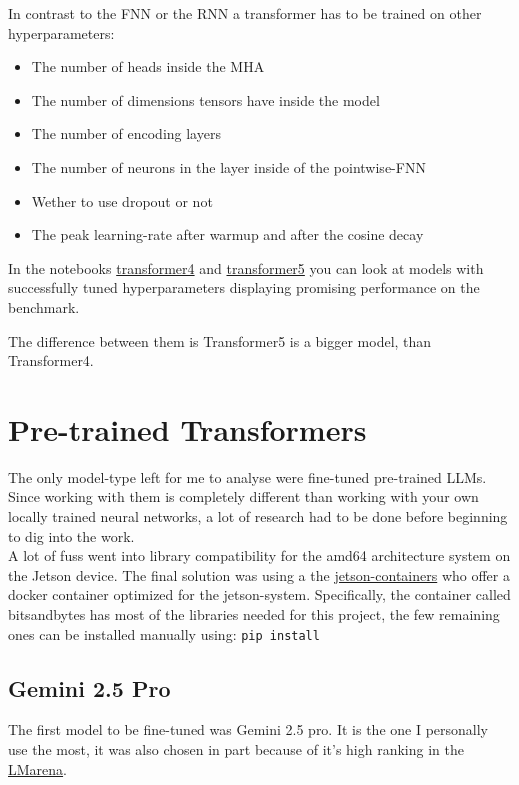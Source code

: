 \documentclass{article}
\begin{document}
In contrast to the FNN or the RNN a transformer has to be trained on other 
hyperparameters: 
\begin{itemize}
    \item The number of heads inside the MHA
    \item The number of dimensions tensors have inside the model
    \item The number of encoding layers
    \item The number of neurons in the layer inside of the pointwise-FNN
    \item Wether to use dropout or not
    \item The peak learning-rate after warmup and after the cosine decay
\end{itemize}


In the notebooks \href{https://github.com/AntonStantan/matura/blob/main/transformer/transformer4.ipynb}
{transformer4} and \href{https://github.com/AntonStantan/matura/blob/main/transformer/transformer5.ipynb}
{transformer5} you can look at models with successfully tuned 
hyperparameters displaying promising performance on the benchmark.

The difference between them is Transformer5 is a bigger model, than 
Transformer4.

\section{Pre-trained Transformers}

The only model-type left for me to analyse were fine-tuned pre-trained LLMs.
Since working with them is completely different than working with your own 
locally trained neural networks, a lot of research had to be done before 
beginning to dig into the work.
\\[1em]
A lot of fuss went into library compatibility for the amd64 architecture 
system on the Jetson device. The final solution was using a the 
\href{https://github.com/dusty-nv/jetson-containers}{jetson-containers} 
who offer a docker container optimized for the jetson-system. Specifically, 
the container called bitsandbytes has most of the libraries needed for this 
project, the few remaining ones can be installed manually using: \texttt{pip install}


\subsection{Gemini 2.5 Pro}
The first model to be fine-tuned was Gemini 2.5 pro. It is the one I 
personally use the most, it was also chosen in part because of it's high 
ranking in the \href{https://lmarena.ai/leaderboard}{LMarena}. 
\end{document}
